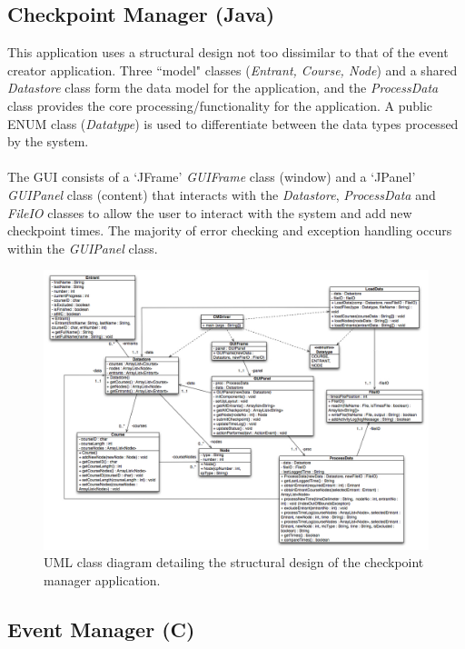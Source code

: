 \documentclass[a4paper, 10pt]{article}
\begin{document}
\clearpage
\subsection{Checkpoint Manager (Java)}

This application uses a structural design not too dissimilar to that of the event creator application. Three ``model" classes (\textit{Entrant, Course, Node}) and a shared \textit{Datastore} class form the data model for the application, and the \textit{ProcessData} class provides the core processing/functionality for the application. A public ENUM class (\textit{Datatype}) is used to differentiate between the data types processed by the system. \\\\
The GUI consists of a `JFrame' \textit{GUIFrame} class (window) and a `JPanel' \textit{GUIPanel} class (content) that interacts with the \textit{Datastore}, \textit{ProcessData} and \textit{FileIO} classes to allow the user to interact with the system and add new checkpoint times. The majority of error checking and exception handling occurs within the \textit{GUIPanel} class.

\begin{figure}[ht!]
\centering
\includegraphics[scale=0.38]{checkpoint_manager_class_diagram.jpg}
\caption{UML class diagram detailing the structural design of the checkpoint manager application.}
\end{figure}

\subsection{Event Manager (C)}
\end{document}
